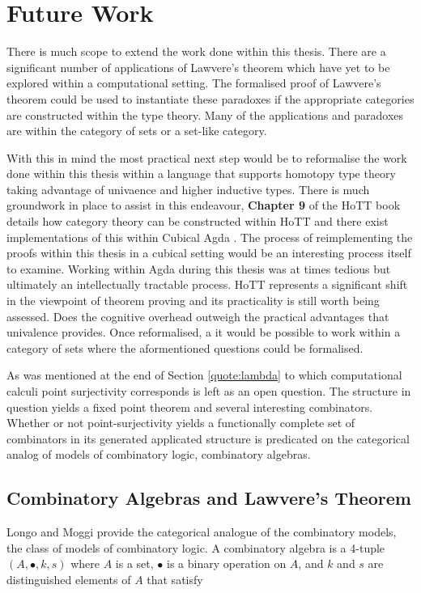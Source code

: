 \section{Future Work}
There is much scope to extend the work done within this thesis. There are a
significant number of applications of Lawvere's theorem which have yet to be
explored within a computational setting. The formalised proof of Lawvere's
theorem could be used to instantiate these paradoxes if the appropriate
categories are constructed within the type theory. Many of the applications and
paradoxes are within the category of sets or a set-like category.


With this in mind the most practical next step would be to reformalise the work
done within this thesis within a language that supports homotopy type theory
taking advantage of univaence and higher inductive types. There is much
groundwork in place to assist in this endeavour, \textbf{Chapter 9} of
the HoTT book details how category theory can be constructed within HoTT and
there exist implementations of this within Cubical Agda . The
process of reimplementing the proofs within this thesis in a cubical setting
would be an interesting process itself to examine. Working within Agda during
this thesis was at times tedious but ultimately an intellectually tractable
process. HoTT represents a significant shift in the viewpoint of theorem proving
and its practicality is still worth being assessed. Does the cognitive overhead
outweigh the practical advantages that univalence provides. Once reformalised, a
it would be possible to work within a category of sets where the aformentioned
questions could be formalised.


As was mentioned at the end of Section \ref{quote:lambda} to which computational
calculi point surjectivity corresponds is left as an open question. The
structure in question yields a fixed point theorem and several interesting
combinators. Whether or not point-surjectivity yields a functionally complete
set of combinators in its generated applicated structure is predicated on the
categorical analog of models of combinatory logic, combinatory algebras.

\subsection{Combinatory Algebras and Lawvere's Theorem}
\label{section:combin}
Longo and Moggi \cite{longo1990category} provide the categorical analogue of the combinatory models, the
class of models of combinatory logic. A combinatory algebra is a 4-tuple
$(A, \bullet, k, s)$ where $A$ is a set, $\bullet$ is a binary operation on
$A$, and $k$ and $s$ are distinguished elements of $A$ that satisfy

